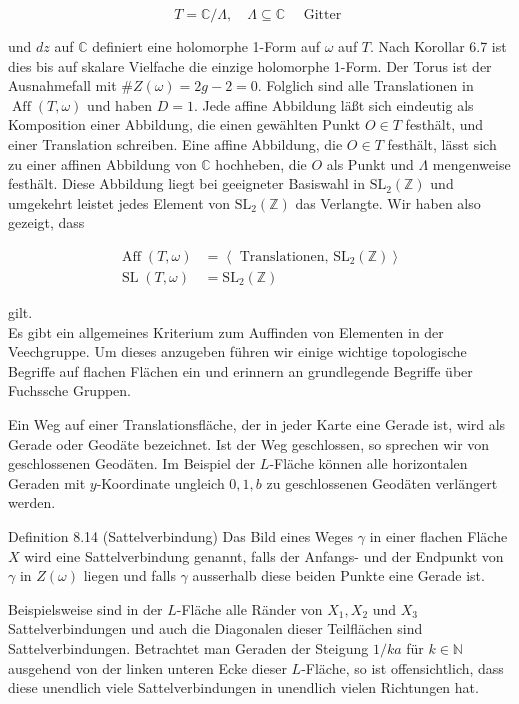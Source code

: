 \documentclass[10pt, letterpaper]{article}
\begin{document}
$$
T=\mathbb{C} / \Lambda, \quad \Lambda \subseteq \mathbb{C} \quad \text { Gitter }
$$

und $d z$ auf $\mathbb{C}$ definiert eine holomorphe 1-Form auf $\omega$ auf $T$. Nach Korollar 6.7 ist dies bis auf skalare Vielfache die einzige holomorphe 1-Form. Der Torus ist der Ausnahmefall mit $\# Z(\omega)=2 g-2=0$. Folglich sind alle Translationen in $\operatorname{Aff}(T, \omega)$ und haben $D=1$. Jede affine Abbildung läßt sich eindeutig als Komposition einer Abbildung, die einen gewählten Punkt $O \in T$ festhält, und einer Translation schreiben. Eine affine Abbildung, die $O \in T$ festhält, lässt sich zu einer affinen Abbildung von $\mathbb{C}$ hochheben, die $O$ als Punkt und $\Lambda$ mengenweise festhält. Diese Abbildung liegt bei geeigneter Basiswahl in $\mathrm{SL}_{2}(\mathbb{Z})$ und umgekehrt leistet jedes Element von $\mathrm{SL}_{2}(\mathbb{Z})$ das Verlangte. Wir haben also gezeigt, dass

$$
\begin{aligned}
\operatorname{Aff}(T, \omega) & =\left\langle\text { Translationen, } \mathrm{SL}_{2}(\mathbb{Z})\right\rangle \\
\operatorname{SL}(T, \omega) & =\mathrm{SL}_{2}(\mathbb{Z})
\end{aligned}
$$

gilt.\\
Es gibt ein allgemeines Kriterium zum Auffinden von Elementen in der Veechgruppe. Um dieses anzugeben führen wir einige wichtige topologische Begriffe auf flachen Flächen ein und erinnern an grundlegende Begriffe über Fuchssche Gruppen.

Ein Weg auf einer Translationsfläche, der in jeder Karte eine Gerade ist, wird als Gerade oder Geodäte bezeichnet. Ist der Weg geschlossen, so sprechen wir von geschlossenen Geodäten. Im Beispiel der $L$-Fläche können alle horizontalen Geraden mit $y$-Koordinate ungleich $0,1, b$ zu geschlossenen Geodäten verlängert werden.

Definition 8.14 (Sattelverbindung) Das Bild eines Weges $\gamma$ in einer flachen Fläche $X$ wird eine Sattelverbindung genannt, falls der Anfangs- und der Endpunkt von $\gamma$ in $Z(\omega)$ liegen und falls $\gamma$ ausserhalb diese beiden Punkte eine Gerade ist.

Beispielsweise sind in der $L$-Fläche alle Ränder von $X_{1}, X_{2}$ und $X_{3}$ Sattelverbindungen und auch die Diagonalen dieser Teilflächen sind Sattelverbindungen. Betrachtet man Geraden der Steigung $1 / k a$ für $k \in \mathbb{N}$ ausgehend von der linken unteren Ecke dieser $L$-Fläche, so ist offensichtlich, dass diese unendlich viele Sattelverbindungen in unendlich vielen Richtungen hat.
\end{document}
